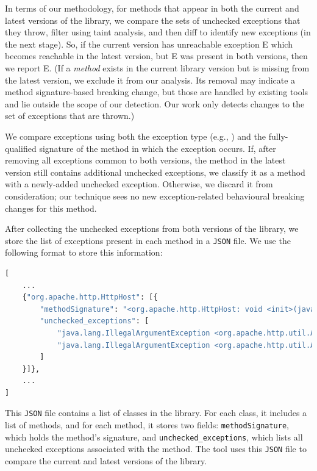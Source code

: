 
In terms of our methodology, for methods that appear in both the current and latest versions of the library, we compare the sets of unchecked exceptions that they throw, filter using taint analysis, and then diff to identify new exceptions (in the next stage). So, if the current version has unreachable exception E which becomes reachable in the latest version, but E was present in both versions, then we report E. (If a \emph{method} exists in the current library version but is missing from the latest version, we exclude it from our analysis. Its removal may indicate a method signature-based breaking change, but those are handled by existing tools and lie outside the scope of our detection. Our work only detects changes to the set of exceptions that are thrown.)

We compare exceptions using both the exception type (e.g., \texttt{}) and the fully-qualified signature of the method in which the exception occurs. If, after removing all exceptions common to both versions, the method in the latest version still contains additional unchecked exceptions, we classify it as a method with a newly-added unchecked exception. Otherwise, we discard it from consideration; our technique sees no new exception-related behavioural breaking changes for this method.

After collecting the unchecked exceptions from both versions of the library, we store the list of exceptions present in each method in a \texttt{JSON} file. We use the following format to store this information:
\begin{lstlisting}[language=python]
[
    ...
    {"org.apache.http.HttpHost": [{
        "methodSignature": "<org.apache.http.HttpHost: void <init>(java.lang.String,int)>",
        "unchecked_exceptions": [
            "java.lang.IllegalArgumentException <org.apache.http.util.Args: java.lang.CharSequence containsNoBlanks(java.lang.CharSequence,java.lang.String)>",
            "java.lang.IllegalArgumentException <org.apache.http.util.Args: java.lang.CharSequence containsNoBlanks(java.lang.CharSequence,java.lang.String)>"
        ]
    }]},
    ...
]
\end{lstlisting}

This \texttt{JSON} file contains a list of classes in the library. For each class, it includes a list of methods, and for each method, it stores two fields: \texttt{methodSignature}, which holds the method’s signature, and \texttt{unchecked\_exceptions}, which lists all unchecked exceptions associated with the method. The tool uses this \texttt{JSON} file to compare the current and latest versions of the library.

